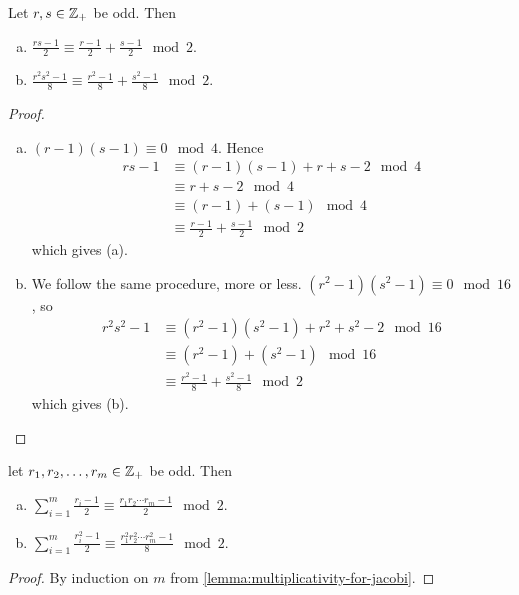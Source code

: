 \begin{lemma}\label{lemma:multiplicativity-for-jacobi}
    Let $r, s\in\mathbb Z_+$ be odd. Then
    \begin{enumerate}[(a)]
        \item $\displaystyle\frac{rs-1}{2}\equiv \frac{r-1}{2} + \frac{s-1}{2}\mod 2$.
        \item $\displaystyle\frac{r^2s^2 - 1}{8} \equiv \frac{r^2-1}{8} + \frac{s^2 - 1}{8}\mod 2$.
    \end{enumerate}
\end{lemma}
\begin{proof}
    ~\begin{enumerate}[(a)]
        \item $(r-1)(s-1)\equiv 0\mod 4$. Hence
              \begin{align*}
                  rs - 1 & \equiv (r-1)(s-1) + r + s - 2\mod 4          \\
                         & \equiv r + s - 2\mod{4}                      \\
                         & \equiv (r-1) + (s-1)\mod{4}                  \\
                         & \equiv \frac{r-1}{2} + \frac{s-1}{2} \mod{2}
              \end{align*}
              which gives (a).
        \item We follow the same procedure, more or less. $(r^2-1)(s^2-1)\equiv 0\mod{16}$, so
              \begin{align*}
                  r^2s^2-1 & \equiv (r^2-1)(s^2-1)+r^2+s^2-2\mod{16}         \\
                           & \equiv (r^2-1)+(s^2-1)\mod{16}                  \\
                           & \equiv \frac{r^2-1}{8} + \frac{s^2-1}{8}\mod{2}
              \end{align*}
              which gives (b).
    \end{enumerate}
\end{proof}

\begin{corollary}
    let $r_1, r_2, \dots, r_m\in\mathbb Z_+$ be odd. Then
    \begin{enumerate}[(a)]
        \item $\displaystyle
                  \sum_{i=1}^m \frac{r_i-1}{2} \equiv \frac{r_1r_2\cdots r_m - 1}{2}\mod 2
              $.
        \item $\displaystyle
                  \sum_{i=1}^m \frac{r_i^2 - 1}{2}\equiv \frac{r_1^2r_2^2\cdots r_m^2 - 1}{8}\mod 2
              $.
    \end{enumerate}
\end{corollary}
\begin{proof}
    By induction on $m$ from \cref{lemma:multiplicativity-for-jacobi}.
\end{proof}

